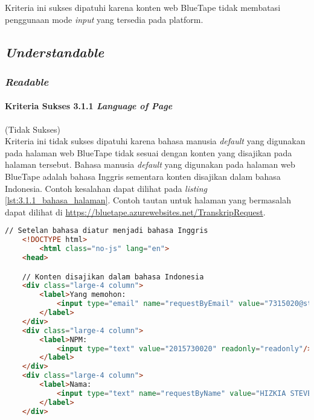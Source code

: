 Kriteria ini sukses dipatuhi karena konten web BlueTape tidak membatasi penggunaan mode \textit{input} yang tersedia pada platform.

\subsection{\textit{Understandable}}
\label{subsec:kepatuhan_bluetape_understandable}

\subsubsection{\textit{Readable}}
\label{subsubsec:kepatuhan_bluetape_readable}

\paragraph{Kriteria Sukses 3.1.1 \textit{Language of Page}}
\label{par:kepatuhan_bluetape_kriteria_sukses_3.1.1}
(Tidak Sukses)\\

Kriteria ini tidak sukses dipatuhi karena bahasa manusia \textit{default} yang digunakan pada halaman web BlueTape tidak sesuai dengan konten yang disajikan pada halaman tersebut. Bahasa manusia \textit{default} yang digunakan pada halaman web BlueTape adalah bahasa Inggris sementara konten disajikan dalam bahasa Indonesia. Contoh kesalahan dapat dilihat pada \textit{listing} \ref{lst:3.1.1_bahasa_halaman}. Contoh tautan untuk halaman yang bermasalah dapat dilihat di \url{https://bluetape.azurewebsites.net/TranskripRequest}.

\begin{lstlisting}[frame=single, label={lst:3.1.1_bahasa_halaman}, language=HTML, caption=Pelanggaran Kriteria Sukses 3.1.1 pada Halaman Cetak Transkrip]
    // Setelan bahasa diatur menjadi bahasa Inggris
    <!DOCTYPE html>
        <html class="no-js" lang="en">
    <head>

    // Konten disajikan dalam bahasa Indonesia
    <div class="large-4 column">
        <label>Yang memohon:
            <input type="email" name="requestByEmail" value="7315020@student.unpar.ac.id" readonly="readonly"/>
        </label>
    </div>
    <div class="large-4 column">
        <label>NPM:
            <input type="text" value="2015730020" readonly="readonly"/>
        </label>
    </div>
    <div class="large-4 column">
        <label>Nama:
            <input type="text" name="requestByName" value="HIZKIA STEVEN" readonly="readonly"/>
        </label>
    </div>
\end{lstlisting}

